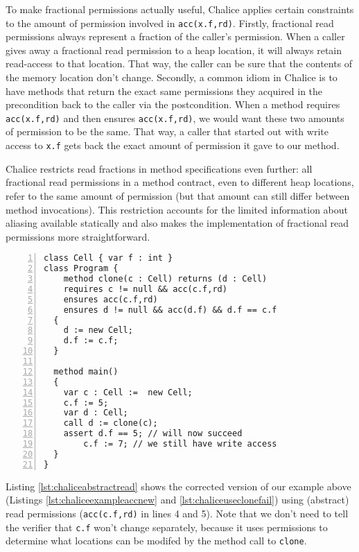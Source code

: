 To make fractional permissions actually useful, Chalice applies certain constraints to the amount of permission involved in \lstinline!acc(x.f,rd)!. 
Firstly, fractional read permissions always represent a fraction of the caller's permission. 
When a caller gives away a fractional read permission to a heap location, it will always retain read-access to that location. 
That way, the caller can be sure that the contents of the memory location don't change.
Secondly, a common idiom in Chalice is to have methods that return the exact same permissions they acquired in the precondition back to the caller via the postcondition.
When a method requires \lstinline!acc(x.f,rd)! and then ensures \lstinline!acc(x.f,rd)!, we would want these two amounts of permission to be the same. 
That way, a caller that started out with write access to \lstinline!x.f! gets back the exact amount of permission it gave to our method.

Chalice restricts read fractions in method specifications even further: all fractional read permissions in a method contract, even to different heap locations, refer to the same amount of permission (but that amount can still differ between method invocations).
This restriction accounts for the limited information about aliasing available statically and also makes the implementation of fractional read permissions more straightforward.


\begin{lstlisting}[language=Chalice,float,caption={Corrected example using abstract read permissions},label={lst:chaliceabstractread},numbers=left]
class Cell { var f : int }
class Program {
 	method clone(c : Cell) returns (d : Cell)
    requires c != null && acc(c.f,rd)
    ensures acc(c.f,rd)
    ensures d != null && acc(d.f) && d.f == c.f
  {
    d := new Cell;
    d.f := c.f;
  }

  method main()
  {
    var c : Cell :=  new Cell;
    c.f := 5;
    var d : Cell;
    call d := clone(c);
    assert d.f == 5; // will now succeed
		c.f := 7; // we still have write access
  }
}
\end{lstlisting}

Listing \ref{lst:chaliceabstractread} shows the corrected version of our example above (Listings \ref{lst:chaliceexampleaccnew} and \ref{lst:chaliceuseclonefail}) using (abstract) read permissions (\lstinline!acc(c.f,rd)! in lines 4 and 5). 
Note that we don't need to tell the verifier that \lstinline!c.f! won't change separately, because it uses permissions to determine what locations can be modifed by the method call to \lstinline!clone!.

